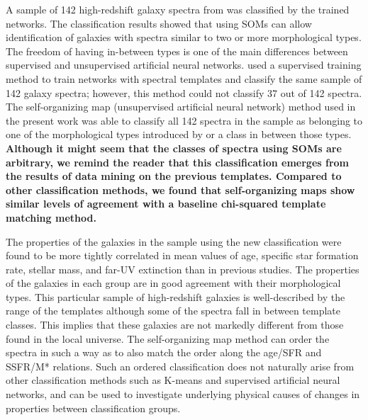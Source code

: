\documentclass[useAMS,usenatbib]{mn2e}
\begin{document}
    A sample of 142 high-redshift galaxy spectra from  was classified by the trained networks.
    The classification results showed that using SOMs can allow identification of galaxies with spectra similar to two or more morphological types.
    The freedom of having in-between types is one of the main differences between supervised and unsupervised artificial neural networks.
     used a supervised training method to train networks with  spectral templates and classify the same sample of 142 galaxy spectra;
    however, this method could not classify 37 out of 142 spectra.
    The self-organizing map (unsupervised artificial neural network) method used in the present work was able to classify  all 142 spectra in the sample
    as belonging to one of the morphological types introduced by  or a class in between those types.
    \textbf{Although it might seem that the classes of spectra using SOMs are arbitrary, we remind the reader that this classification emerges from the results of data mining on the previous templates.
    Compared to other classification methods, we found that self-organizing maps show similar levels of agreement with a baseline chi-squared template matching method.}



    The properties of the galaxies in the  sample using the new classification were found to be more tightly correlated in mean values of age, specific star formation rate, stellar mass, and far-UV extinction than in previous studies. 
    The properties of the galaxies in each group are in good agreement with their morphological types.
    This particular sample of high-redshift galaxies is well-described by the range of the  templates although some of the spectra fall in between template classes.
    This implies that these galaxies are not markedly different from those found in the local universe.
    The self-organizing map method can order the spectra in such a way as to also match the order along the age/SFR and SSFR/M* relations.
    Such an ordered classification does not naturally arise from other classification methods such as K-means and supervised artificial neural networks, and can be used to investigate underlying physical causes of changes in properties between classification groups.
\end{document}

